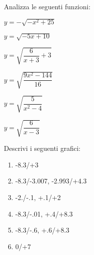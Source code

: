 \begin{esercizio}\label{ese:stufun.4e}
Analizza le seguenti funzioni:
\begin{multicols}{3}
 \begin{enumeratea}
  \item \(y = -\sqrt{-x^2 +25}\) \\ [.8em]%
  \item \(y = \sqrt{-5x +10}\) %
  \item \(y = \sqrt{\dfrac{6}{x +3}+3}\) \\ %
  \item \(y = \sqrt{\dfrac{9x^2 -144}{16}}\) %
  \item \(y = \sqrt{\dfrac{5}{x^2 -4}}\) \\%
  \item \(y = \sqrt{\dfrac{6}{x -3}}\) %
 \end{enumeratea}
\end{multicols}
\end{esercizio}

\bigskip

\begin{esercizio}\label{ese:stufun.5g}
Descrivi i seguenti grafici:
\begin{multicols}{2}
 \begin{enumerate} [left=0pt, label=\alph*)]
  \item \myp 
{}
{-8.3/+3} %
  \item \myp 
{} 
{-8.3/-3.007, -2.993/+4.3} %
  \item \myp 
{} 
{-2./-.1, +.1/+2} %
\vspace{1mm}
  \item \myp 
{}
{-8.3/-.01, +.4/+8.3} %
  \item \myp 
{}
{-8.3/-.6, +.6/+8.3} %
  \item \myp 
{}
{0/+7} %
 \end{enumerate}
\end{multicols}
\end{esercizio}

